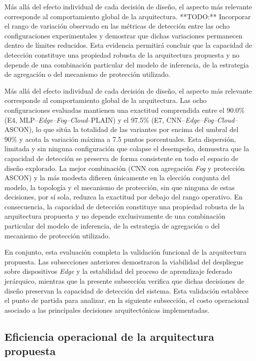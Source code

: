 \documentclass[journal,article,submit,moreauthors]{Definitions/mdpi}
\begin{document}
Más allá del efecto individual de cada decisión de diseño, el aspecto más relevante corresponde al comportamiento global de la arquitectura. **TODO:** Incorporar el rango de variación observado en las métricas de detección entre las ocho configuraciones experimentales y demostrar que dichas variaciones permanecen dentro de límites reducidos. Esta evidencia permitirá concluir que la capacidad de detección constituye una propiedad robusta de la arquitectura propuesta y no depende de una combinación particular del modelo de inferencia, de la estrategia de agregación o del mecanismo de protección utilizado.

Más allá del efecto individual de cada decisión de diseño, el aspecto más relevante corresponde al comportamiento global de la arquitectura. Las ocho configuraciones evaluadas mantienen una exactitud comprendida entre el 90.0\% (E4, MLP--\textit{Edge--Fog--Cloud}--PLAIN) y el 97.5\% (E7, CNN--\textit{Edge--Fog--Cloud}--ASCON), lo que sitúa la totalidad de las variantes por encima del umbral del 90\% y acota la variación máxima a 7.5 puntos porcentuales. Esta dispersión, limitada y sin ninguna configuración que colapse el desempeño, demuestra que la capacidad de detección se preserva de forma consistente en todo el espacio de diseño explorado. La mejor combinación (CNN con agregación \textit{Fog} y protección ASCON) y la más modesta difieren únicamente en la elección conjunta del modelo, la topología y el mecanismo de protección, sin que ninguna de estas decisiones, por sí sola, reduzca la exactitud por debajo del rango operativo. En consecuencia, la capacidad de detección constituye una propiedad robusta de la arquitectura propuesta y no depende exclusivamente de una combinación particular del modelo de inferencia, de la estrategia de agregación o del mecanismo de protección utilizado.

En conjunto, esta evaluación completa la validación funcional de la arquitectura propuesta. Las subsecciones anteriores demostraron la viabilidad del despliegue sobre dispositivos \textit{Edge} y la estabilidad del proceso de aprendizaje federado jerárquico, mientras que la presente subsección verifica que dichas decisiones de diseño preservan la capacidad de detección del sistema. Esta validación establece el punto de partida para analizar, en la siguiente subsección, el costo operacional asociado a las principales decisiones arquitectónicas implementadas.

\subsection{Eficiencia operacional de la arquitectura propuesta}
\end{document}
